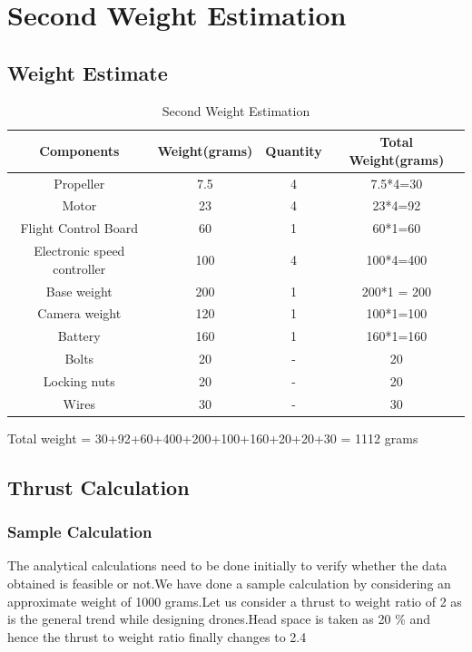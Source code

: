 \chapter{Second Weight Estimation}

\section{Weight Estimate}
\begin{table}[h!]
 \begin{center}
 \begin{tabular}{|c| c |c |c|} 
 \hline
 Components & Weight(grams) & Quantity & Total Weight(grams) \\ [0.5ex] 
 \hline
 Propeller & 7.5 & 4 & 7.5*4=30 \\ 
 \hline
 Motor & 23 & 4 & 23*4=92 \\
 \hline
 Flight Control Board & 60  & 1 & 60*1=60 \\
 \hline
 Electronic speed controller & 100 & 4 & 100*4=400 \\ 
 \hline
 Base weight & 200 & 1 & 200*1 = 200 \\ 
 \hline
 Camera weight & 120 & 1 & 100*1=100 \\ 
 \hline
 Battery & 160 & 1 & 160*1=160 \\ 
 \hline
 Bolts & 20 & - & 20 \\ 
 \hline
 Locking nuts & 20 & - & 20 \\ 
 \hline
 Wires & 30 & - & 30 \\ 
 \hline
\end{tabular}
\caption{\label{table:weight_estimation}Second Weight Estimation}
\end{center}

\end{table}
Total weight = 30+92+60+400+200+100+160+20+20+30 = 1112 grams
\section{Thrust Calculation}

\subsection{Sample Calculation}

The analytical calculations need to be done initially to verify whether the data obtained is feasible or not.We have done a sample calculation by considering an 
approximate weight of 1000 grams.Let us consider a thrust to weight ratio of 2 as is the general trend while designing drones.Head space is taken as 20 \% and hence the thrust to weight ratio finally changes to 2.4

